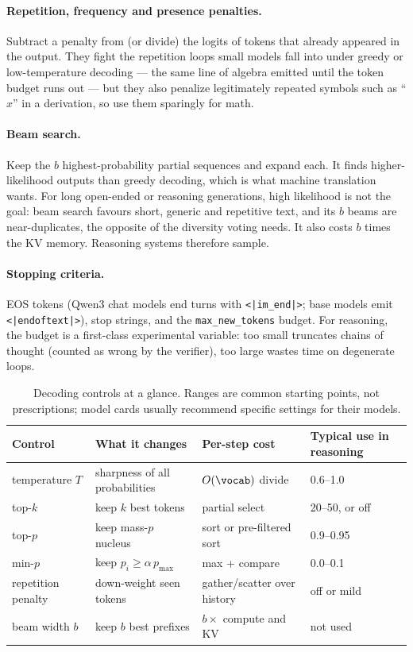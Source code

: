 \paragraph{Repetition, frequency and presence penalties.} Subtract a penalty from (or divide) the
logits of tokens that already appeared in the output. They fight the repetition loops small models
fall into under greedy or low-temperature decoding --- the same line of algebra emitted until the
token budget runs out --- but they also penalize legitimately repeated symbols such as
``$x$'' in a derivation, so use them sparingly for math.

\paragraph{Beam search.} Keep the $b$ highest-probability partial sequences and expand each. It finds
higher-likelihood outputs than greedy decoding, which is what machine translation wants. For long
open-ended or reasoning generations, high likelihood is not the goal: beam search favours short,
generic and repetitive text, and its $b$ beams are near-duplicates, the opposite of the diversity
voting needs. It also costs $b$ times the KV memory. Reasoning systems therefore sample.

\paragraph{Stopping criteria.} EOS tokens (Qwen3 chat models end turns with
\texttt{<|im\_end|>}; base models emit \texttt{<|endoftext|>}), stop strings, and the
\texttt{max\_new\_tokens} budget. For reasoning, the budget is a first-class experimental variable:
too small truncates chains of thought (counted as wrong by the verifier), too large wastes time on
degenerate loops.

\begin{table}[t]
\centering\small
\begin{tabular}{@{}llll@{}}
\toprule
Control & What it changes & Per-step cost & Typical use in reasoning \\
\midrule
temperature $T$ & sharpness of all probabilities & $O(\vocab)$ divide & 0.6--1.0 \\
top-$k$ & keep $k$ best tokens & partial select & 20--50, or off \\
top-$p$ & keep mass-$p$ nucleus & sort or pre-filtered sort & 0.9--0.95 \\
min-$p$ & keep $p_i \ge \alpha\, p_{\max}$ & max + compare & 0.0--0.1 \\
repetition penalty & down-weight seen tokens & gather/scatter over history & off or mild \\
beam width $b$ & keep $b$ best prefixes & $b\times$ compute and KV & not used \\
\bottomrule
\end{tabular}
\caption{Decoding controls at a glance. Ranges are common starting points, not prescriptions; model
cards usually recommend specific settings for their models.}
\label{tab:scaling:controls}
\end{table}

